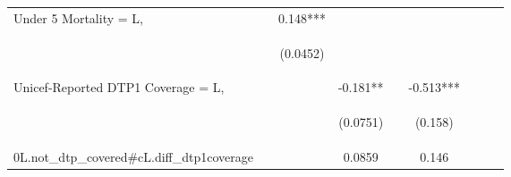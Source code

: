 \documentclass[]{article}
\begin{document}
\begin{center}
\begin{tabular}{lcccccccc}
Under 5 Mortality = L, &  & 0.148*** &  &  &  &  &  &  \\
\vspace{4pt} & \begin{footnotesize}\end{footnotesize} & \begin{footnotesize}(0.0452)\end{footnotesize} & \begin{footnotesize}\end{footnotesize} & \begin{footnotesize}\end{footnotesize} & \begin{footnotesize}\end{footnotesize} & \begin{footnotesize}\end{footnotesize} & \begin{footnotesize}\end{footnotesize} & \begin{footnotesize}\end{footnotesize} \\
Unicef-Reported DTP1 Coverage = L, &  &  & -0.181** &  & -0.513*** &  &  &  \\
\vspace{4pt} & \begin{footnotesize}\end{footnotesize} & \begin{footnotesize}\end{footnotesize} & \begin{footnotesize}(0.0751)\end{footnotesize} & \begin{footnotesize}\end{footnotesize} & \begin{footnotesize}(0.158)\end{footnotesize} & \begin{footnotesize}\end{footnotesize} & \begin{footnotesize}\end{footnotesize} & \begin{footnotesize}\end{footnotesize} \\
0L.not\_dtp\_covered\#cL.diff\_dtp1coverage &  &  & 0.0859 &  & 0.146 &  &  &  \\

\end{tabular}
\end{center}
\end{document}
